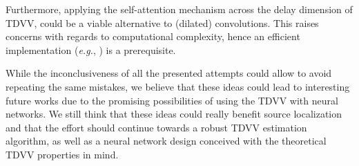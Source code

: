 Furthermore, applying the self-attention mechanism across the delay dimension of TDVV, could be a viable alternative to (dilated) convolutions. This raises concerns with regards to computational complexity, hence an efficient implementation (\emph{e.g.}, \cite{katharopoulos_transformers_2020}) is a prerequisite.

While the inconclusiveness of all the presented attempts could allow to avoid repeating the same mistakes, we believe that these ideas could lead to interesting future works due to the promising possibilities of using the TDVV with neural networks. We still think that these ideas could really benefit source localization and that the effort should continue towards a robust TDVV estimation algorithm, as well as a neural network design conceived with the theoretical TDVV properties in mind. 
